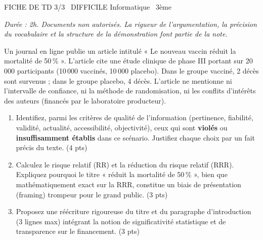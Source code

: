 \documentclass[11pt]{article}
\begin{document}
\begin{tcolorbox}[enhanced,colback=popink,colframe=popink,arc=10pt,boxrule=0pt,left=12pt,right=12pt,top=9pt,bottom=9pt]
{\color{white}\popxbold\small FICHE DE TD 3/3 \textbullet\ DIFFICILE \hfill Informatique \textbullet\ 3ème\par}
\end{tcolorbox}
\vspace{4pt}
\textit{Durée : 2h. Documents non autorisés. La rigueur de l'argumentation, la précision du vocabulaire et la structure de la démonstration font partie de la note.}

\begin{exercice}
Un journal en ligne publie un article intitulé « \og Le nouveau vaccin réduit la mortalité de 50\,\% \fg{} ». L'article cite une étude clinique de phase III portant sur 20\,000 participants (10\,000 vaccinés, 10\,000 placebo). Dans le groupe vacciné, 2 décès sont survenus ; dans le groupe placebo, 4 décès. L'article ne mentionne ni l'intervalle de confiance, ni la méthode de randomisation, ni les conflits d'intérêts des auteurs (financés par le laboratoire producteur).
\begin{enumerate}
    \item Identifiez, parmi les critères de qualité de l'information (pertinence, fiabilité, validité, actualité, accessibilité, objectivité), ceux qui sont \textbf{violés} ou \textbf{insuffisamment établis} dans ce scénario. Justifiez chaque choix par un fait précis du texte. \hfill (4 pts)
    \item Calculez le risque relatif (RR) et la réduction du risque relatif (RRR). Expliquez pourquoi le titre « réduit la mortalité de 50\,\% », bien que mathématiquement exact sur la RRR, constitue un biais de présentation (framing) trompeur pour le grand public. \hfill (3 pts)
    \item Proposez une réécriture rigoureuse du titre et du paragraphe d'introduction (3 lignes max) intégrant la notion de significativité statistique et de transparence sur le financement. \hfill (3 pts)
\end{enumerate}
\end{exercice}
\end{document}
